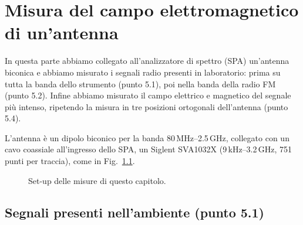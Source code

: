 \documentclass[11pt,a4paper,oneside]{book}
\begin{document}
\chapter{Misura del campo elettromagnetico di un'antenna}
\label{cap:campo}

In questa parte abbiamo collegato all'analizzatore di spettro (SPA) un'antenna biconica e abbiamo misurato i segnali radio presenti in laboratorio: prima su tutta la banda dello strumento (punto 5.1), poi nella banda della radio FM (punto 5.2). Infine abbiamo misurato il campo elettrico e magnetico del segnale più intenso, ripetendo la misura in tre posizioni ortogonali dell'antenna (punto 5.4).

L'antenna è un dipolo biconico per la banda 80\,MHz--2.5\,GHz, collegato con un cavo coassiale all'ingresso dello SPA, un Siglent SVA1032X (9\,kHz--3.2\,GHz, 751 punti per traccia), come in Fig.~\ref{fig:5_setup}. 

\begin{figure}[H]
\centering
{}
\caption{Set-up delle misure di questo capitolo.}
\label{fig:5_setup}
\end{figure}

\section{Segnali presenti nell'ambiente (punto 5.1)}
\label{sec:5_1}
\end{document}

